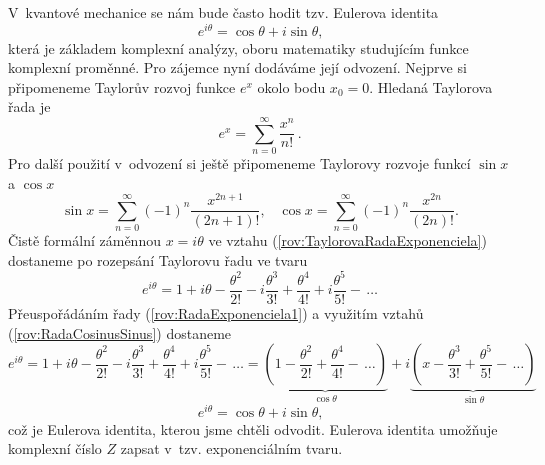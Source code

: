 V~kvantové mechanice se nám bude často hodit tzv. Eulerova identita
\begin{equation}
\boxed{e^{i \theta} = \cos \theta + i \sin \theta \mbox{,}}
\label{rov:EulerovaIdentita}
\end{equation}
která je základem komplexní analýzy, oboru matematiky studujícím funkce komplexní proměnné. Pro zájemce nyní dodáváme její odvození. Nejprve si připomeneme Taylorův rozvoj funkce $e^{x}$ okolo bodu $x_0 = 0$. Hledaná Taylorova řada je
\begin{equation}
e^x = \sum_{n=0}^{\infty} \frac{x^n}{n!} \,\mbox{.}
\label{rov:TaylorovaRadaExponenciela}
\end{equation}
Pro další použití v~odvození si ještě připomeneme Taylorovy rozvoje funkcí $\sin x$ a $\cos x$
\begin{equation}
\sin x = \sum_{n=0}^{\infty} (-1)^{n} \frac{x^{2n+1}}{(2n+1)!} \mbox{,} \quad \cos x = \sum_{n=0}^{\infty} (-1)^{n} \frac{x^{2n}}{(2n)!} \mbox{.}
\label{rov:RadaCosinusSinus}
\end{equation}
Čistě formální záměnnou $x = i \theta$ ve vztahu (\ref{rov:TaylorovaRadaExponenciela}) dostaneme po rozepsání Taylorovu řadu ve tvaru
\begin{equation}
e^{i\theta} = 1 + i\theta - \frac{\theta^2}{2!} - i \frac{\theta^3}{3!} + \frac{\theta^4}{4!} + i \frac{\theta^5}{5!} -\,\dots
\label{rov:RadaExponenciela1}
\end{equation}
Přeuspořádáním řady (\ref{rov:RadaExponenciela1}) a využitím vztahů (\ref{rov:RadaCosinusSinus}) dostaneme
\newpage
\begin{displaymath}
e^{i\theta} = 1 + i\theta - \frac{\theta^2}{2!} - i \frac{\theta^3}{3!} + \frac{\theta^4}{4!} + i \frac{\theta^5}{5!} -\,\dots =\underbrace{\left(1 - \frac{\theta^2}{2!} + \frac{\theta^4}{4!} - \,\dots \right)}_{\cos \theta} + i \underbrace{\left(x - \frac{\theta^3}{3!} + \frac{\theta^5}{5!} - \,\dots \right)}_{\sin \theta}
\end{displaymath}
\begin{equation}
e^{i\theta} = \cos \theta + i\sin \theta \mbox{,}
\label{rov:DukazEulerovaIdentita}
\end{equation}
což je Eulerova identita, kterou jsme chtěli odvodit. Eulerova identita umožňuje komplexní číslo $Z$ zapsat v~tzv. exponenciálním tvaru.

